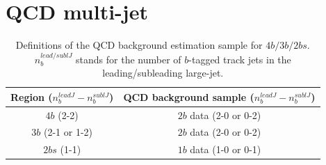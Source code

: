 \section{QCD multi-jet}
\label{sec:boosted-qcd}

\begin{table}[htb!]
\begin{center}
\caption{Definitions of the QCD background estimation sample for $4b/3b/2bs$. $n^{lead/sublJ}_{b}$ stands for the number of $b$-tagged track jets in the leading/subleading large-\R jet.}
\begin{tabular}{c|c}
\hline
  Region ($n^{leadJ}_{b} - n^{sublJ}_{b}$)  & QCD background sample ($n^{leadJ}_{b} - n^{sublJ}_{b}$) \\
  \hline
  $4b$ (2-2) & $2b$ data (2-0 or 0-2) \\
  $3b$ (2-1 or 1-2)& $2b$ data (2-0 or 0-2) \\
  $2bs$ (1-1) & $1b$ data (1-0 or 0-1) \\
  \end{tabular}
\label{tab:boosted-qcd-bkgsample}
\end{center}
\end{table}

